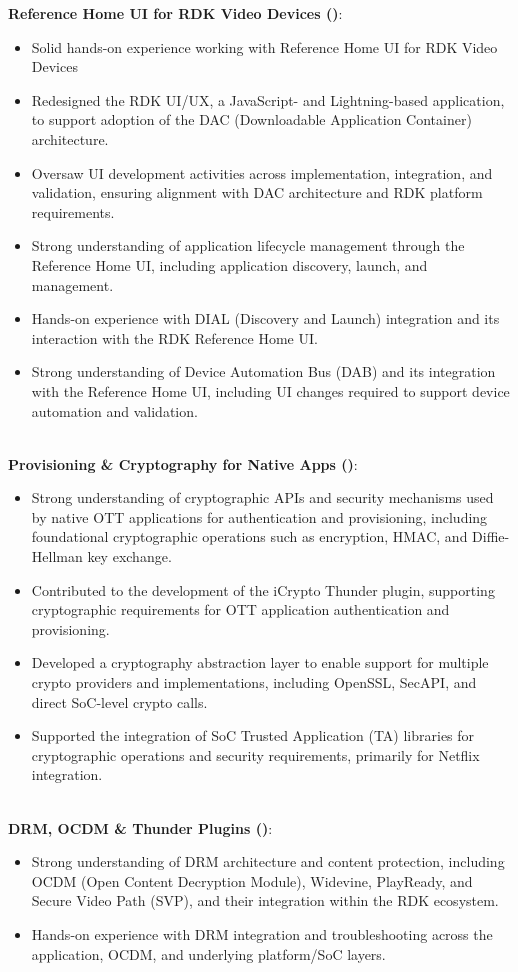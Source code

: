 \documentclass[a4paper,20pt]{article}
\newcommand{\resumeItem}[2]{
  \item\small{
    \textbf{#1}{: #2 \vspace{-2pt}}
  }
}
\newcommand{\resumeSubSubItem}[1]{
  \item[-] \small{#1}
}
\newcommand{\resumeItemListStart}{\begin{itemize}}
\newcommand{\resumeItemListEnd}{\end{itemize}\vspace{-5pt}}
\begin{document}
          \resumeItem{Reference Home UI for RDK Video Devices ({\color{Gray}{Lightning/JavaScript}})}
          {\\}
          \resumeItemListStart
              \resumeSubSubItem{Solid hands-on experience working with Reference Home UI for RDK Video Devices}
              \resumeSubSubItem{Redesigned the RDK UI/UX, a JavaScript- and Lightning-based application, to support adoption of the DAC (Downloadable Application Container) architecture.}
              \resumeSubSubItem{Oversaw UI development activities across implementation, integration, and validation, ensuring alignment with DAC architecture and RDK platform requirements.}
              \resumeSubSubItem{Strong understanding of application lifecycle management through the Reference Home UI, including application discovery, launch, and management.}
              \resumeSubSubItem{Hands-on experience with DIAL (Discovery and Launch) integration and its interaction with the RDK Reference Home UI.}
              \resumeSubSubItem{Strong understanding of Device Automation Bus (DAB) and its integration with the Reference Home UI, including UI changes required to support device automation and validation.\\~}
          \resumeItemListEnd

          \resumeItem{Provisioning \& Cryptography for Native Apps ({\color{Gray}{C/C++}})}
          {\\}
          \resumeItemListStart
              \resumeSubSubItem{Strong understanding of cryptographic APIs and security mechanisms used by native OTT applications for authentication and provisioning, including foundational cryptographic operations such as encryption, HMAC, and Diffie-Hellman key exchange.}
              \resumeSubSubItem{Contributed to the development of the iCrypto Thunder plugin, supporting cryptographic requirements for OTT application authentication and provisioning.}
              \resumeSubSubItem{Developed a cryptography abstraction layer to enable support for multiple crypto providers and implementations, including OpenSSL, SecAPI, and direct SoC-level crypto calls.}
              \resumeSubSubItem{Supported the integration of SoC Trusted Application (TA) libraries for cryptographic operations and security requirements, primarily for Netflix integration.\\~}
          \resumeItemListEnd

          \resumeItem{DRM, OCDM \& Thunder Plugins ({\color{Gray}{C/C++}})}
          {\\}
          \resumeItemListStart
              \resumeSubSubItem{Strong understanding of DRM architecture and content protection, including OCDM (Open Content Decryption Module), Widevine, PlayReady, and Secure Video Path (SVP), and their integration within the RDK ecosystem.}
              \resumeSubSubItem{Hands-on experience with DRM integration and troubleshooting across the application, OCDM, and underlying platform/SoC layers.\\~}
          \resumeItemListEnd
\end{document}
